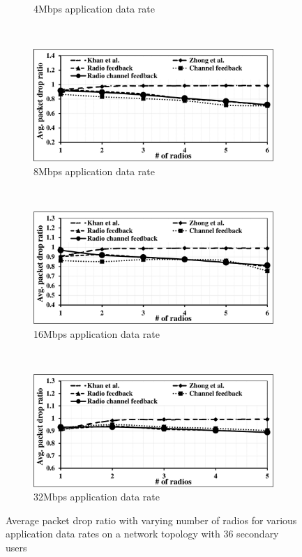 \begin{landscape}
\begin{figure}[!htbp]
\begin{subfigure}[t]{0.625\textwidth}
        \caption{4Mbps application data rate}
    \end{subfigure}
    ~
    \begin{subfigure}[t]{0.625\textwidth}
        \includegraphics[width=\textwidth]{alltopology/36PacketDropRatio24d8}
        \caption{8Mbps application data rate}
    \end{subfigure}
    ~\\
    \begin{subfigure}[t]{0.625\textwidth}
        \includegraphics[width=\textwidth]{alltopology/36PacketDropRatio24d16}
        \caption{16Mbps application data rate}
    \end{subfigure}
    ~
    \begin{subfigure}[t]{0.625\textwidth}
        \includegraphics[width=\textwidth]{alltopology/36PacketDropRatio24d32}
        \caption{32Mbps application data rate}
    \end{subfigure}
    \caption{Average packet drop ratio with varying number of radios for various application data rates on a network topology with 36 secondary users}
\end{figure}
\end{landscape}
